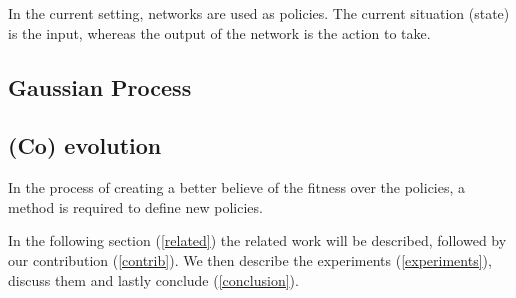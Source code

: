 In the current setting, networks are used as policies. The current situation (state) is the input, whereas the output of the network is the action to take. 

\subsection{Gaussian Process}

\subsection{(Co) evolution}
In the process of creating a better believe of the fitness over the policies, a method is required to define new policies. 


In the following section (\ref{related}) the related work will be described, followed by our contribution (\ref{contrib}). We then describe the experiments (\ref{experiments}), discuss them and lastly conclude (\ref{conclusion}).


